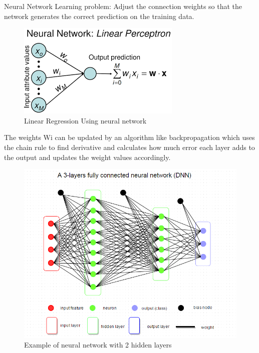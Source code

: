 \documentclass{report}
\begin{document}
Neural Network Learning problem: Adjust the connection weights so that the network generates the correct
prediction on the training data.

\begin{figure}[H]
 \includegraphics[width=\linewidth]{mneuron.png}
 \caption{Linear Regression Using neural network}
\end{figure}

 The weights Wi can be updated by an algorithm like backpropagation which uses the chain rule to find derivative and calculates how much error each layer adds to the output and updates the weight values accordingly. 


\begin{figure}[H]
 \includegraphics[width=\linewidth]{mneuron1.png}
 \caption{Example of neural network with  2 hidden layers}
\end{figure}
\end{document}
